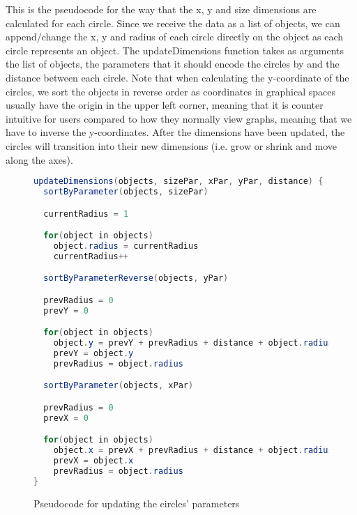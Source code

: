 \documentclass[Report.tex]{subfiles}
\begin{document}
\noindent This is the pseudocode for the way that the x, y and size dimensions are calculated for each circle.
Since we receive the data as a list of objects, we can append/change the x, y and radius of each circle directly on the object as each circle represents an object. The updateDimensions function takes as arguments the list of objects, the parameters that it should encode the circles by and the distance between each circle. Note that when calculating the y-coordinate of the circles, we sort the objects in reverse order as coordinates in graphical spaces usually have the origin in the upper left corner, meaning that it is counter intuitive for users compared to how they normally view graphs, meaning that we have to inverse the y-coordinates. After the dimensions have been updated, the circles will transition into their new dimensions (i.e. grow or shrink and move along the axes).

\begin{figure}
\begin{lstlisting}[language=java]
updateDimensions(objects, sizePar, xPar, yPar, distance) {
  sortByParameter(objects, sizePar)

  currentRadius = 1

  for(object in objects)
    object.radius = currentRadius
    currentRadius++

  sortByParameterReverse(objects, yPar)

  prevRadius = 0
  prevY = 0

  for(object in objects)
    object.y = prevY + prevRadius + distance + object.radius
    prevY = object.y
    prevRadius = object.radius

  sortByParameter(objects, xPar)

  prevRadius = 0
  prevX = 0

  for(object in objects)
    object.x = prevX + prevRadius + distance + object.radius
    prevX = object.x
    prevRadius = object.radius
}
\end{lstlisting}
\caption{Pseudocode for updating the circles' parameters}
\end{figure}
\end{document}
